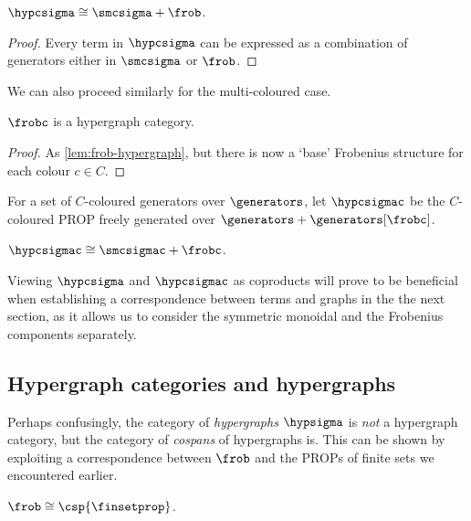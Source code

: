 \begin{lemma}
    \(\hypcsigma \cong \smcsigma + \frob\).
\end{lemma}
\begin{proof}
    Every term in \(\hypcsigma\) can be expressed as a combination of
    generators either in \(\smcsigma\) or \(\frob\).
\end{proof}

We can also proceed similarly for the multi-coloured case.

\begin{lemma}\label{lem:frobc-hypergraph}
    \(\frobc\) is a hypergraph category.
\end{lemma}
\begin{proof}
    As \cref{lem:frob-hypergraph}, but there is now a `base' Frobenius
    structure for each colour \(c \in C\).
\end{proof}

\begin{definition}
    For a set of \(C\)-coloured generators over \(\generators\), let
    \(\hypcsigmac\) be the \(C\)-coloured PROP freely generated over
    \(\generators + \generators[\frobc]\).
\end{definition}

\begin{lemma}
    \(\hypcsigmac \cong \smcsigmac + \frobc\).
\end{lemma}

Viewing \(\hypcsigma\) and \(\hypcsigmac\) as coproducts will prove to be
beneficial when establishing a correspondence between terms and graphs in the
the next section, as it allows us to consider the symmetric monoidal and the
Frobenius components separately.

\subsection{Hypergraph categories and hypergraphs}

Perhaps confusingly, the category of \emph{hypergraphs} \(\hypsigma\) is
\emph{not} a hypergraph category, but the category of \emph{cospans} of
hypergraphs is.
This can be shown by exploiting a correspondence between \(\frob\) and the PROPs
of finite sets we encountered earlier.

\begin{proposition}\label{prop:frob-finset}
    \(\frob \cong \csp{\finsetprop}\).
\end{proposition}

